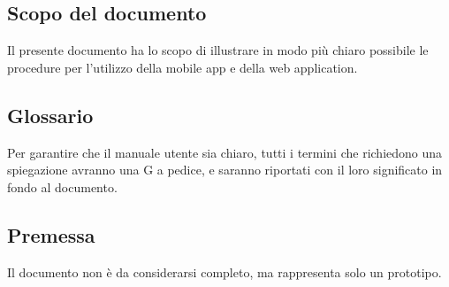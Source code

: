 \documentclass[../manuale-utente.tex]{subfiles}
\begin{document}
\subsection{Scopo del documento}%
\label{sub:scopo_del_documento}
Il presente documento ha lo scopo di illustrare in modo più chiaro possibile le procedure per l'utilizzo della mobile app e della web application.

\subsection{Glossario}%
\label{sub:glossario}
Per garantire che il manuale utente sia chiaro, tutti i termini che richiedono una spiegazione avranno una G a pedice, e saranno riportati con il loro significato in fondo al documento.

\subsection{Premessa}%
\label{sub:premessa}
Il documento non è da considerarsi completo, ma rappresenta solo un prototipo.
\end{document}
